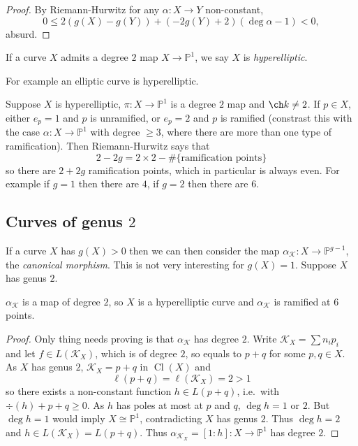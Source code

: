 \documentclass[a4paper]{article}
\DeclareMathOperator{\Cl}{Cl}
\renewcommand*{\P}{\mathbb{P}}
\begin{document}
\begin{proof}
  By Riemann-Hurwitz for any \(\alpha: X \to Y\) non-constant,
  \[
    0 \leq 2(g(X) - g(Y)) + (-2g(Y) + 2)(\deg \alpha - 1) < 0,
  \]
  absurd.
\end{proof}

\begin{definition}[hyperelliptic]
  If a curve \(X\) admits a degree \(2\) map \(X \to \P^1\), we say \(X\) is \emph{hyperelliptic}.
\end{definition}
For example an elliptic curve is hyperelliptic.

Suppose \(X\) is hyperelliptic, \(\pi: X \to \P^1\) is a degree \(2\) map and \(\ch k \neq 2\). If \(p \in X\), either \(e_p = 1\) and \(p\) is unramified, or \(e_p = 2\) and \(p\) is ramified (constrast this with the case \(\alpha: X \to \P^1\) with degree \(\geq 3\), where there are more than one type of ramification). Then Riemann-Hurwitz says that
\[
  2 - 2g = 2 \times 2 - \#\{\text{ramification points}\}
\]
so there are \(2 + 2g\) ramification points, which in particular is always even. For example if \(g = 1\) then there are \(4\), if \(g = 2\) then there are \(6\).

\subsection{Curves of genus \(2\)}

If a curve \(X\) has \(g(X) > 0\) then we can then consider the map \(\alpha_{\mathcal K}: X \to \P^{g - 1}\), the \emph{canonical morphism}. This is not very interesting for \(g(X) = 1\). Suppose \(X\) has genus \(2\).

\begin{proposition}
  \(\alpha_{\mathcal K}\) is a map of degree \(2\), so \(X\) is a hyperelliptic curve and \(\alpha_{\mathcal K}\) is ramified at \(6\) points.
\end{proposition}

\begin{proof}
  Only thing needs proving is that \(\alpha_{\mathcal K}\) has degree \(2\). Write \(\mathcal K_X = \sum n_i p_i\) and let \(f \in L(\mathcal K_X)\), which is of degree \(2\), so equals to \(p + q\) for some \(p, q \in X\). As \(X\) has genus \(2\), \(\mathcal K_X = p + q\) in \(\Cl(X)\) and
  \[
    \ell(p + q) = \ell(\mathcal K_X) = 2 > 1
  \]
  so there exists a non-constant function \(h \in L(p + q)\), i.e.\ with \(\div (h) + p + q \geq 0\). As \(h\) has poles at most at \(p\) and \(q\), \(\deg h = 1\) or \(2\). But \(\deg h = 1\) would imply \(X \cong \P^1\), contradicting \(X\) has genus \(2\). Thus \(\deg h = 2\) and \(h \in L(\mathcal K_X) = L(p + q)\). Thus \(\alpha_{\mathcal K_X} = [1:h]: X \to \P^1\) has degree \(2\).
\end{proof}
\end{document}
